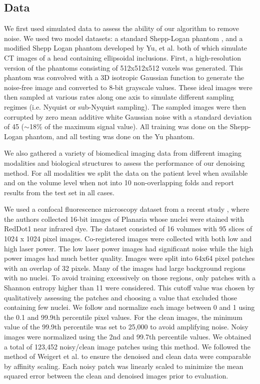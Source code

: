 \documentclass[12pt]{spieman}
\begin{document}
\begin{spacing}{2}
\subsection{Data}

We first used simulated data to assess the ability of our algorithm to remove noise. We used two model datasets: a standard Shepp-Logan phantom \cite{Shepp1974}, and a modified Shepp Logan phantom developed by Yu, et al.\cite{Yu2004} both of which simulate CT images of a head containing ellipsoidal inclusions. First, a high-resolution version of the phantoms consisting of 512x512x512 voxels was generated. This phantom was convolved with a 3D isotropic Gaussian function to generate the noise-free image and converted to 8-bit grayscale values. These ideal images were then sampled at various rates along one axis to simulate different sampling regimes (i.e. Nyquist or sub-Nyquist sampling). The sampled images were then corrupted by zero mean additive white Gaussian noise with a standard deviation of 45 ($\sim$18\% of the maximum signal value). All training was done on the Shepp-Logan phantom, and all testing was done on the Yu phantom.

We also gathered a variety of biomedical imaging data from different imaging modalities and biological structures to assess the performance of our denoising method. For all modalities we split the data on the patient level when available and on the volume level when not into 10 non-overlapping folds and report results from the test set in all cases.

We used a confocal fluorescence microscopy dataset from a recent study \cite{Weigert2018b}, where the authors collected 16-bit images of Planaria whose nuclei were stained with RedDot1 near infrared dye. The dataset consisted of 16 volumes with 95 slices of 1024 x 1024 pixel images. Co-registered images were collected with both low and high laser power. The low laser power images had significant noise while the high power images had much better quality. Images were split into 64x64 pixel patches with an overlap of 32 pixels. Many of the images had large background regions with no nuclei. To avoid training excessively on those regions, only patches with a Shannon entropy higher than 11 were considered. This cutoff value was chosen by qualitatively assessing the patches and choosing a value that excluded those containing few nuclei. We follow \cite{Weigert2018b} and normalize each image between 0 and 1 using the 0.1 and 99.9th percentile pixel values. For the clean images, the minimum value of the 99.9th percentile was set to 25,000 to avoid amplifying noise. Noisy images were normalized using the 2nd and 99.7th percentile values. We obtained a total of 123,452 noisy/clean image patches using this method. We followed the method of Weigert et al.\cite{Weigert2018b} to ensure the denoised and clean data were comparable by affinity scaling. Each noisy patch was linearly scaled to minimize the mean squared error between the clean and denoised images prior to evaluation. 


\end{spacing}
\end{document}
